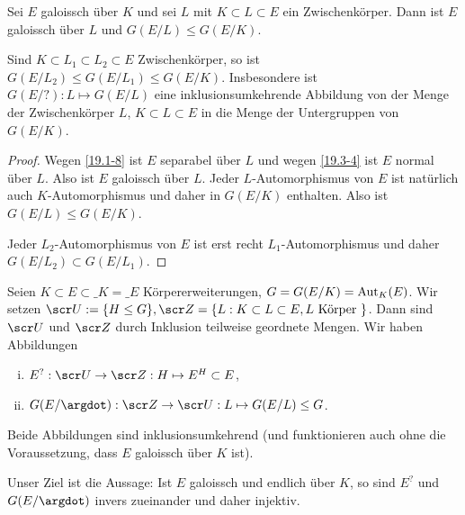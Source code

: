\begin{lem} \label{19.4-11}
	Sei $E$ galoissch über $K$ und sei $L$ mit $K \subset L \subset E$ ein Zwischenkörper.
	Dann ist $E$ galoissch über $L$ und $G(E / L) \le G(E / K)$.

	Sind $K \subset L_1 \subset L_2 \subset E$ Zwischenkörper, so ist $G(E / L_2) \le G(E / L_1) \le G(E / K)$.
	Insbesondere ist $G(E / ?): L \mapsto G(E / L)$ eine inklusionsumkehrende Abbildung von der Menge der Zwischenkörper $L$, $K \subset L \subset E$ in die Menge der Untergruppen von $G(E / K)$.
	\begin{proof}
		Wegen \ref{19.1-8} ist $E$ separabel über $L$ und wegen \ref{19.3-4} ist $E$ normal über $L$.
		Also ist $E$ galoissch über $L$.
		Jeder $L$-Automorphismus von $E$ ist natürlich auch $K$-Automorphismus und daher in $G(E / K)$ enthalten.
		Also ist $G(E / L) \le G(E / K)$.

		Jeder $L_2$-Automorphismus von $E$ ist erst recht $L_1$-Automorphismus und daher $G(E / L_2) \subset G(E / L_1)$.
	\end{proof}
\end{lem}

\begin{conv} \label{19.4-12}
	Seien $K \subset E \subset \_K = \_E$ Körpererweiterungen, $G = G(E / K) = \operatorname{Aut}_K(E)$.
	Wir setzen $\scr U := \{ H \le G \}, \scr Z = \{ L : K \subset L \subset E, L\text{ Körper } \}$.
	Dann sind $\scr U$ und $\scr Z$ durch Inklusion teilweise geordnete Mengen.
	Wir haben Abbildungen
	\begin{enumerate}[i)]
		\item
			$E^? : \scr U \to \scr Z : H \mapsto E^H \subset E$,
		\item
			$G(E / \argdot): \scr Z \to \scr U : L \mapsto G(E / L) \le G$.
	\end{enumerate}
	Beide Abbildungen sind inklusionsumkehrend (und funktionieren auch ohne die Voraussetzung, dass $E$ galoissch über $K$ ist).
\end{conv}

Unser Ziel ist die Aussage:
Ist $E$ galoissch und endlich über $K$, so sind $E^?$ und $G(E / \argdot)$ invers zueinander und daher injektiv.

